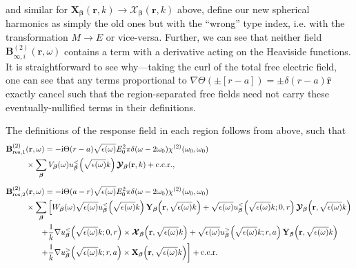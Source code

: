 \documentclass{article}
\begin{document}
and similar for $\mathbf{X}_{\bm{\beta}}(\mathbf{r},k)\to\bm{\mathcal{X}}_{\bm{\beta}}(\mathbf{r},k)$ above, define our new spherical harmonics as simply the old ones but with the ``wrong'' type index, i.e. with the transformation $M\to E$ or vice-versa. Further, we can see that neither field $\mathbf{B}_{\infty,i}^{(2)}(\mathbf{r},\omega)$ contains a term with a derivative acting on the Heaviside functions. It is straightforward to see why---taking the curl of the total free electric field, one can see that any terms proportional to $\nabla\Theta(\pm [r - a]) = \pm\delta(r - a)\hat{\mathbf{r}}$ exactly cancel such that the region-separated free fields need not carry these eventually-nullified terms in their definitions.

The definitions of the response field in each region follows from above, such that
\begin{equation}
\begin{split}
\mathbf{B}_{\mathrm{res},1}^{(2)}&(\mathbf{r},\omega) = -\mathrm{i}\Theta(r - a)\sqrt{\epsilon(\omega)}E_0^2\pi\delta(\omega - 2\omega_0)\chi^{(2)}(\omega_0,\omega_0)\\
&\times\sum_{\bm{\beta}}V_{\bm{\beta}}(\omega)u_{\bm{\beta}}^<\!\left(\sqrt{\epsilon(\omega)}k\right)\bm{\mathcal{Y}}_{\bm{\beta}}(\mathbf{r},k) + \mathrm{c.c.r.},\\[0.5em]
\mathbf{B}_{\mathrm{res},2}^{(2)}&(\mathbf{r},\omega) = -\mathrm{i}\Theta(a - r)\sqrt{\epsilon(\omega)}E_0^2\pi\delta(\omega - 2\omega_0)\chi^{(2)}(\omega_0,\omega_0)\\
&\times\sum_{\bm{\beta}}\left[W_{\bm{\beta}}(\omega)\sqrt{\epsilon(\omega)}u_{\bm{\beta}}^<\!\left(\sqrt{\epsilon(\omega)}k\right)\mathbf{Y}_{\bm{\beta}}\!\left(\mathbf{r},\sqrt{\epsilon(\omega)}k\right) + \sqrt{\epsilon(\omega)}u_{\bm{\beta}}^<\!\left(\sqrt{\epsilon(\omega)}k;0,r\right)\bm{\mathcal{Y}}_{\bm{\beta}}\!\left(\mathbf{r},\sqrt{\epsilon(\omega)}k\right)\right.\\
&\hspace{0.05\textwidth}\left. + \frac{1}{k}\nabla u_{\bm{\beta}}^<\!\left(\sqrt{\epsilon(\omega)}k;0,r\right)\times\bm{\mathcal{X}}_{\bm{\beta}}\!\left(\mathbf{r},\sqrt{\epsilon(\omega)}k\right) + \sqrt{\epsilon(\omega)}u_{\bm{\beta}}^>\!\left(\sqrt{\epsilon(\omega)}k;r,a\right)\mathbf{Y}_{\bm{\beta}}\!\left(\mathbf{r},\sqrt{\epsilon(\omega)}k\right)\right.\\
&\hspace{0.05\textwidth}\left. + \frac{1}{k}\nabla u_{\bm{\beta}}^>\!\left(\sqrt{\epsilon(\omega)}k;r,a\right)\times\mathbf{X}_{\bm{\beta}}\!\left(\mathbf{r},\sqrt{\epsilon(\omega)}k\right)\right] + \mathrm{c.c.r.}
\end{split}
\end{equation}
\end{document}
